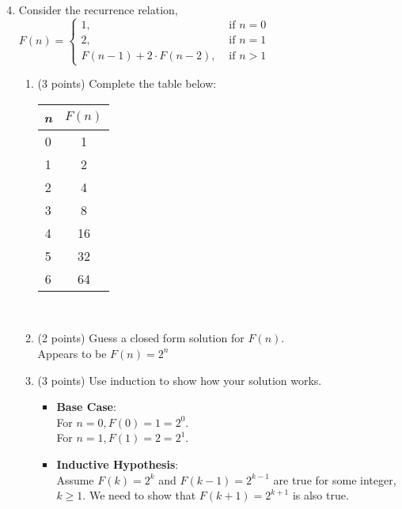 \documentclass{article}
\begin{document}
\begin{enumerate}
\setcounter{enumi}{3}
    \item Consider the recurrence relation, $F(n) = \begin{cases}
        1, &\text{ if } n = 0 \\
        2, &\text { if } n = 1 \\
        F(n-1) + 2\cdot F(n-2), &\text{ if } n > 1
    \end{cases}$
    \begin{enumerate}
        \item (3 points) Complete the table below: \\
        
        \begin{tabular}{c|c}
            \textit{n} & \(F(n)\) \\
            \hline
            0 & 1 \\
            1 & 2 \\
            2 & 4 \\
            3 & 8 \\
            4 & 16 \\
            5 & 32 \\
            6 & 64 \\
        \end{tabular} \\
        
        \item (2 points) Guess a closed form solution for $F(n).$ \\

        Appears to be $F(n) = 2^n$ \\

        \item (3 points) Use induction to show how your solution works. \\

        \begin{itemize}
            \item \textbf{Base Case}: \\
            For $n = 0, F(0) = 1 = 2^0$. \\
            For $n = 1, F(1) = 2 = 2^1$. \\
            \item \textbf{Inductive Hypothesis}: \\
            Assume $F(k) = 2^k$ and $F(k - 1) = 2^{k - 1}$ are true for some integer, $k \geq 1$. We need to show that $F(k+1) = 2^{k + 1}$ is also true. \\
            

\end{itemize}
\end{enumerate}
\end{enumerate}
\end{document}
